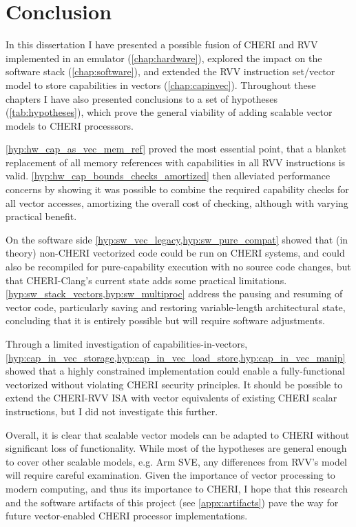 \documentclass[../thesis]{subfiles}
\begin{document}
\chapter{Conclusion}
In this dissertation I have presented a possible fusion of CHERI and RVV implemented in an emulator (\cref{chap:hardware}), explored the impact on the software stack (\cref{chap:software}), and extended the RVV instruction set/vector model to store capabilities in vectors (\cref{chap:capinvec}).
Throughout these chapters I have also presented conclusions to a set of hypotheses (\cref{tab:hypotheses}), which prove the general viability of adding scalable vector models to CHERI processsors.

\cref{hyp:hw_cap_as_vec_mem_ref} proved the most essential point, that a blanket replacement of all memory references with capabilities in all RVV instructions is valid.
\cref{hyp:hw_cap_bounds_checks_amortized} then alleviated performance concerns by showing it was possible to combine the required capability checks for all vector accesses, amortizing the overall cost of checking, although with varying practical benefit.

On the software side \cref{hyp:sw_vec_legacy,hyp:sw_pure_compat} showed that (in theory) non-CHERI vectorized code could be run on CHERI systems, and could also be recompiled for pure-capability execution with no source code changes, but that CHERI-Clang's current state adds some practical limitations.
\cref{hyp:sw_stack_vectors,hyp:sw_multiproc} address the pausing and resuming of vector code, particularly saving and restoring variable-length architectural state, concluding that it is entirely possible but will require software adjustments.

Through a limited investigation of capabilities-in-vectors, \cref{hyp:cap_in_vec_storage,hyp:cap_in_vec_load_store,hyp:cap_in_vec_manip} showed that a highly constrained implementation could enable a fully-functional vectorized  without violating CHERI security principles.
It should be possible to extend the CHERI-RVV ISA with vector equivalents of existing CHERI scalar instructions, but I did not investigate this further.

Overall, it is clear that scalable vector models can be adapted to CHERI without significant loss of functionality.
While most of the hypotheses are general enough to cover other scalable models, e.g. Arm SVE, any differences from RVV's model will require careful examination.
Given the importance of vector processing to modern computing, and thus its importance to CHERI, I hope that this research and the software artifacts of this project (see \cref{appx:artifacts}) pave the way for future vector-enabled CHERI processor implementations.
\end{document}
